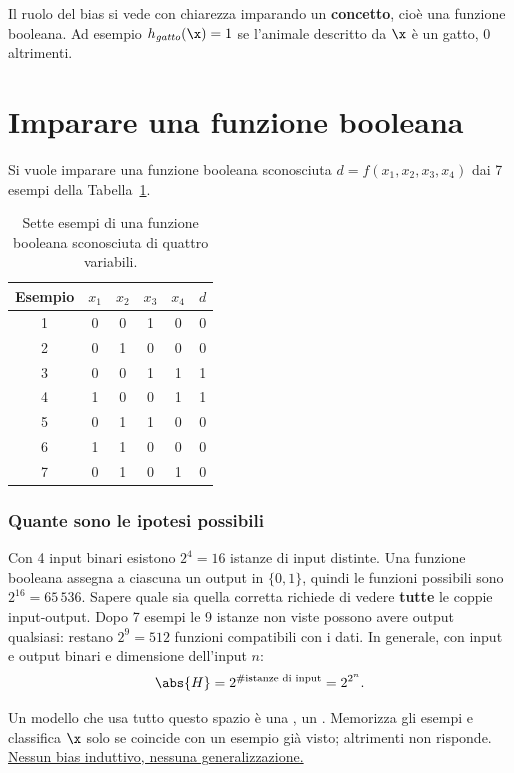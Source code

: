 Il ruolo del bias si vede con chiarezza imparando un \textbf{concetto}, cioè una funzione booleana. Ad esempio
$h_{\mathit{gatto}}(\x)=1$ se l'animale descritto da $\x$ è un gatto, $0$ altrimenti.

\section{Imparare una funzione booleana}

Si vuole imparare una funzione booleana sconosciuta $d = f(x_1,x_2,x_3,x_4)$ dai 7 esempi della
Tabella~\ref{tab:booleana}.

\begin{table}[ht]
\centering\small
\caption{Sette esempi di una funzione booleana sconosciuta di quattro variabili.}
\label{tab:booleana}
\begin{tabular}{ccccc|c}
\toprule
Esempio & $x_1$ & $x_2$ & $x_3$ & $x_4$ & $d$ \\
\midrule
1 & 0 & 0 & 1 & 0 & 0\\
2 & 0 & 1 & 0 & 0 & 0\\
3 & 0 & 0 & 1 & 1 & 1\\
4 & 1 & 0 & 0 & 1 & 1\\
5 & 0 & 1 & 1 & 0 & 0\\
6 & 1 & 1 & 0 & 0 & 0\\
7 & 0 & 1 & 0 & 1 & 0\\
\bottomrule
\end{tabular}
\end{table}

\subsubsection{Quante sono le ipotesi possibili}
Con 4 input binari esistono $2^4=16$ istanze di input distinte. Una funzione booleana assegna a ciascuna un output
in $\{0,1\}$, quindi le funzioni possibili sono $2^{16}=65\,536$. Sapere quale sia quella corretta richiede di
vedere \textbf{tutte} le coppie input-output. Dopo 7 esempi le 9 istanze non viste possono avere output
qualsiasi: restano $2^9 = 512$ funzioni compatibili con i dati. In generale, con input e output binari e
dimensione dell'input $n$:
\begin{equation}\label{eq:numero-booleane}
\abs{H} = 2^{\#\text{istanze di input}} = 2^{2^n}.
\end{equation}

Un modello che usa tutto questo spazio è una , un . Memorizza gli
esempi e classifica $\x$ solo se coincide con un esempio già visto; altrimenti non risponde.
\uline{Nessun bias induttivo, nessuna generalizzazione.}

